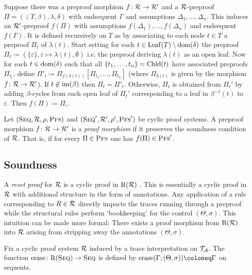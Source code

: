 Suppose there was a preproof morphism $f \colon \mathcal{R} \to \mathcal{R}'$ and a $\mathcal{R}$-preproof $\Pi =
((T, \beta), \lambda, \delta)$ with endsequent $\Gamma$ and assumptions $\Delta_1, \ldots,
\Delta_n$. This induces an $\mathcal{R}'$-preproof $f(\Pi)$ with assumptions
$f(\Delta_1), \ldots, f(\Delta_n)$ and  endsequent $f(\Gamma)$.
It is defined recursively on
$T$ as by associating to each
node $t \in T$ a preproof $\Pi_t$ of $\lambda(t)$. Start setting for each $t \in
\mathrm{Leaf}(T) \setminus \mathrm{dom}(\delta)$ the preproof $\Pi_t \coloneq
(\{\varepsilon\}, \varepsilon \mapsto \lambda(t), \emptyset)$ i.e. the
preproof deriving $\lambda(t)$ as an open leaf. Now for each $t \in \mathrm{dom}(\delta)$ such
that all $\{t_1, \ldots, t_n\} = \mathrm{Chld}(t)$ have associated preproofs
$\Pi_{t_i}$, define $\Pi'_t \coloneq \Pi_{f(\delta(t))}[\Pi_{t_1}, \ldots, \Pi_{t_n}]$
(where $\Pi_{\delta(t)}$ is given by the morphism $f \colon \mathcal{R} \to \mathcal{R}'$). If $t
\not\in \mathrm{im}(\beta)$ then $\Pi_t = \Pi'_t$. Otherwise, $\Pi_t$ is obtained from
$\Pi_t'$ by adding $\beta$-cycles from each open leaf of $\Pi_t'$ corresponding to
a leaf in $\beta^{-1}(t)$ to $\varepsilon$. Then
$f(\Pi) \coloneq \Pi_{\varepsilon}$.

\begin{definition}
  Let $(\textsc{Seq}, \mathcal{R}, \rho, \textsc{Pfs})$ and $(\textsc{Seq}', \mathcal{R}', \rho', \textsc{Pfs}')$ be cyclic proof
  systems. A preproof morphism $f \colon \mathcal{R} \to \mathcal{R}'$ is a \emph{proof morphism} if it
  preserves the soundness condition of $\mathcal{R}$. That is, if for every $\Pi \in \textsc{Pfs}$
  one has $f(\Pi) \in \textsc{Pfs}'$.
\end{definition}

\subsection{Soundness}
\label{sec:sound}

A \emph{reset proof} for \( \mathcal{R} \) is a cyclic proof in $\mathrm{R}(\mathcal{R})$ . This is essentially a cyclic proof
in $\mathcal{R}$ with additional structure in the form of annotations. Any application of a
rule corresponding to $R \in \mathcal{R}$ directly impacts the traces running through a
preproof while the structural rules perform `bookkeeping' for the
control $(\Theta, \sigma)$. This intuition can be made more formal: There exists
a proof morphism from $\mathrm{R}(\mathcal{R})$ into $\mathcal{R}$ arising from stripping away the annotations
$(\Theta, \sigma)$.

Fix a cyclic proof system $\mathcal{R}$ induced by a trace interpretation on
$\mathcal{T}_{\mathcal{A}}$. The function $\mathrm{erase} \colon \mathrm{R}(\textsc{Seq}) \to \textsc{Seq}$ is defined by
$\strip(\Gamma ; (\Theta, \sigma)) \coloneq \Gamma$ on sequents.

